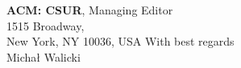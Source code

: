 \documentclass[11pt]{letter}
\begin{document}
\begin{letter}{ {\bf ACM: CSUR}, Managing Editor\\
  1515 Broadway,\\
 New York,  NY 10036, USA }
\vspace*{6ex}
\hspace*{18em} With best regards \\[8ex]
\hspace*{19em} Micha{\l} Walicki

\end{letter}
\end{document}
